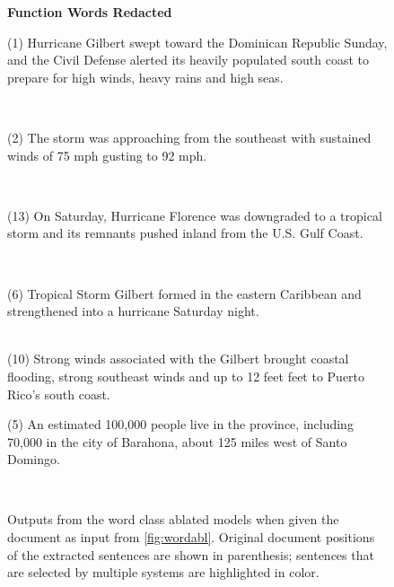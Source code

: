 \begin{figure}[p]
{\begin{minipage}{\textwidth}
\textbf{Function Words Redacted}\\
\colorbox{Orchid!25!}{\begin{minipage}{\textwidth}(1) Hurricane Gilbert swept toward the Dominican Republic Sunday, and the Civil Defense alerted its heavily populated south coast to prepare for high winds, heavy rains and high seas.\end{minipage}}\\
\colorbox{Dandelion!25!}{\begin{minipage}{\textwidth}(2) The storm was approaching from the southeast with sustained winds of 75 mph gusting to 92 mph.\end{minipage}}\\
\colorbox{green!25!}{\begin{minipage}{\textwidth}(13) On Saturday, Hurricane Florence was downgraded to a tropical storm and its remnants pushed inland from the U.S. Gulf Coast.\end{minipage}}\\
\colorbox{ProcessBlue!15!}{\begin{minipage}{\textwidth}(6) Tropical Storm Gilbert formed in the eastern Caribbean and strengthened into a hurricane Saturday night.\end{minipage}}\\
(10) Strong winds associated with the Gilbert brought coastal flooding, strong southeast winds and up to 12 feet feet to Puerto Rico's south coast.\\
\colorbox{GreenYellow!35!}{\begin{minipage}{\textwidth}(5) An estimated 100,000 people live in the province, including 70,000 in the city of Barahona, about 125 miles west of Santo Domingo.\end{minipage}}\\
\endgroup
\end{minipage}}
\caption{Outputs from the word class ablated models when given the document as  input from
\autoref{fig:wordabl}. Original document positions of the extracted sentences are  shown in parenthesis; sentences that are selected by multiple systems
are highlighted in color.}
\label{fig:sumwordabl}
\end{figure}
